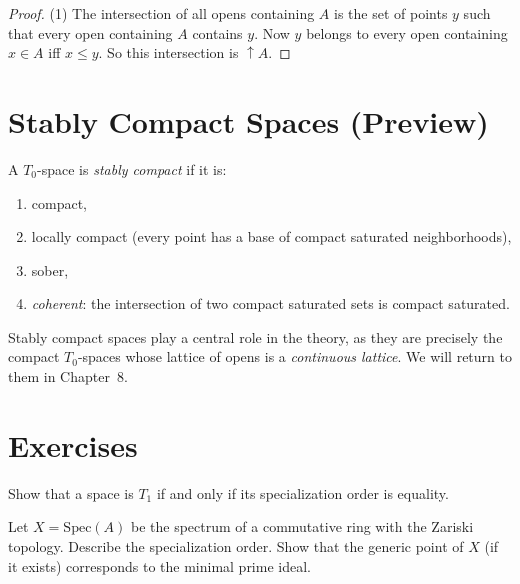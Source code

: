 \begin{proof}
(1) The intersection of all opens containing $A$ is the set of points $y$ such that every
open containing $A$ contains $y$. Now $y$ belongs to every open containing $x \in A$ iff
$x \leq y$. So this intersection is $\uparrow\! A$.
\end{proof}

\section{Stably Compact Spaces (Preview)}

\begin{definition}
A $T_0$-space is \emph{stably compact} if it is:
\begin{enumerate}
  \item compact,
  \item locally compact (every point has a base of compact saturated neighborhoods),
  \item sober,
  \item \emph{coherent}: the intersection of two compact saturated sets is compact
    saturated.
\end{enumerate}
\end{definition}

\begin{remark}
Stably compact spaces play a central role in the theory, as they are precisely the compact
$T_0$-spaces whose lattice of opens is a \emph{continuous lattice}. We will return to them
in Chapter~8.
\end{remark}

\section{Exercises}

\begin{exercise}
Show that a space is $T_1$ if and only if its specialization order is equality.
\end{exercise}

\begin{exercise}
Let $X = \mathrm{Spec}(A)$ be the spectrum of a commutative ring with the Zariski
topology. Describe the specialization order. Show that the generic point of $X$
(if it exists) corresponds to the minimal prime ideal.
\end{exercise}

